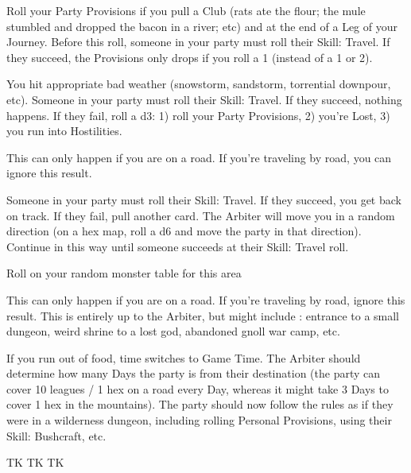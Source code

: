 {\begin{multicols}{2}
  Roll your Party Provisions if you pull a Club (rats ate the flour; the mule stumbled and dropped the bacon in a river; etc) and at the end of a Leg of your Journey.  Before this roll, someone in your party must roll their Skill: Travel.  If they succeed, the Provisions \UD only drops \DCDOWN if you roll a 1 (instead of a 1 or 2).  

  You hit appropriate bad weather (snowstorm, sandstorm, torrential downpour, etc).  Someone in your party must roll their Skill: Travel.  If they succeed, nothing happens.  If they fail, roll a d3:  1) roll your Party Provisions, 2) you're Lost, 3) you run into Hostilities.

  This can only happen if you are  on a road. If you're traveling by road, you can ignore this result.

  Someone in your party must roll their Skill: Travel.  If they succeed, you get back on track.  If they fail, pull another card. The Arbiter will move you in a random direction (on a hex map, roll a d6 and move the party in that direction). Continue in this way until someone succeeds at their Skill: Travel roll.  

  Roll on your random monster table for this area

  This can only happen if you are  on a road. If you're traveling by road, ignore this result.  This is entirely up to the Arbiter, but might include : entrance to a small dungeon, weird shrine to a lost god, abandoned gnoll war camp, etc.


  If you run out of food, time switches to Game Time.  The Arbiter should determine how many Days the party is from their destination (the party can cover 10 leagues / 1 hex on a road every Day, whereas it might take 3 Days to cover 1 hex in the mountains).  The party should now follow the rules as if they were in a wilderness dungeon, including rolling Personal Provisions, using their Skill: Bushcraft, etc. 

  \newpage


  TK TK TK

  \newpage


\end{multicols}}
